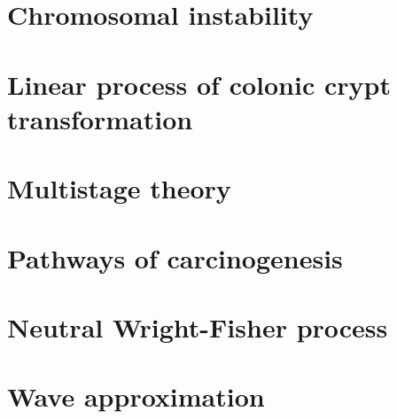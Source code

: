 \newcommand{\package}{\emph}

\setcounter{chapter}{1}
\setcounter{section}{0}
\section{Chromosomal instability}

\setcounter{chapter}{2}
\setcounter{section}{0}
\section{Linear process of colonic crypt transformation}

\setcounter{chapter}{3}
\setcounter{section}{0}
\section{Multistage theory}

\setcounter{chapter}{4}
\setcounter{section}{0}
\section{Pathways of carcinogenesis}

\setcounter{chapter}{5}
\setcounter{section}{0}
\section{Neutral Wright-Fisher process}

\setcounter{chapter}{6}
\setcounter{section}{0}
\section{Wave approximation}
